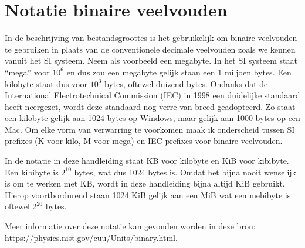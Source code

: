 %
%
%
\section{Notatie binaire veelvouden}
\label{sec:prefixes_binary_multiples}

In de beschrijving van bestandsgroottes is het gebruikelijk om binaire veelvouden te gebruiken in plaats van de conventionele decimale veelvouden zoals we kennen vanuit het SI systeem. Neem als voorbeeld een megabyte. In het SI systeem staat ``mega'' voor $10^{6}$ en dus zou een megabyte gelijk staan een 1 miljoen bytes. Een kilobyte staat dus voor $10^{3}$ bytes, oftewel duizend bytes. Ondanks dat de International Electrotechnical Commission (IEC) in 1998 een duidelijke standaard heeft neergezet, wordt deze standaard nog verre van breed geadopteerd. Zo staat een kilobyte gelijk aan 1024 bytes op Windows, maar gelijk aan 1000 bytes op een Mac. Om elke vorm van verwarring te voorkomen maak ik onderscheid tussen SI prefixes (K voor kilo, M voor mega) en IEC prefixes voor binaire veelvouden.

In de notatie in deze handleiding staat KB voor kilobyte en KiB voor kibibyte. Een kibibyte is $2^{10}$ bytes, wat dus 1024 bytes is. Omdat het bijna nooit wenselijk is om te werken met KB, wordt in deze handleiding bijna altijd KiB gebruikt. Hierop voortbordurend staan 1024 KiB gelijk aan een MiB wat een mebibyte is oftewel $2^{20}$ bytes.

Meer informatie over deze notatie kan gevonden worden in deze bron: \url{https://physics.nist.gov/cuu/Units/binary.html}.